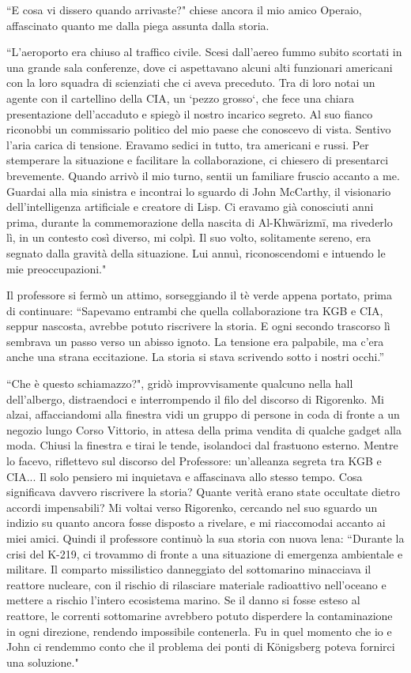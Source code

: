 \documentclass[12pt,b5paper]{article}
\begin{document}
``E cosa vi dissero quando arrivaste?" chiese ancora il mio amico Operaio,
affascinato quanto me dalla piega assunta dalla storia.

``L'aeroporto era chiuso al traffico civile. Scesi dall'aereo fummo subito scortati
in una grande sala conferenze, dove ci aspettavano alcuni alti funzionari americani
con la loro squadra di scienziati che ci aveva preceduto.
Tra di loro notai un agente con il cartellino della CIA, un `pezzo grosso`, che fece una
chiara presentazione dell'accaduto e spiegò il nostro incarico segreto. Al
suo fianco riconobbi un commissario politico del mio paese che conoscevo di vista.
Sentivo l'aria carica di tensione. Eravamo sedici in tutto, tra americani e
russi. Per stemperare la situazione e facilitare la collaborazione, ci chiesero
di presentarci brevemente. Quando arrivò il mio turno, sentii un familiare
fruscio accanto a me. Guardai alla mia sinistra e incontrai lo sguardo di
John McCarthy, il visionario dell'intelligenza artificiale e creatore di Lisp. Ci eravamo già conosciuti anni prima, durante la commemorazione
della nascita di Al-Khwārizmī, ma rivederlo lì, in un contesto così diverso,
mi colpì. Il suo volto, solitamente sereno, era segnato dalla gravità della
situazione. Lui annuì, riconoscendomi e intuendo le mie preoccupazioni."

Il professore si fermò un attimo, sorseggiando il tè verde appena portato, prima di
continuare: ``Sapevamo entrambi che quella collaborazione tra KGB e CIA, seppur nascosta,
avrebbe potuto riscrivere la storia. E ogni secondo trascorso lì sembrava un passo
verso un abisso ignoto. La tensione era palpabile, ma c’era anche una strana
eccitazione. La storia si stava scrivendo sotto i nostri occhi.”

``Che è questo schiamazzo?", gridò improvvisamente qualcuno nella hall
dell'albergo, distraendoci e interrompendo il filo del discorso di Rigorenko. Mi
alzai, affacciandomi alla finestra vidi un gruppo di persone in coda di fronte
a un negozio lungo Corso Vittorio, in attesa della prima vendita di qualche
gadget alla moda. Chiusi la finestra e tirai le tende, isolandoci dal frastuono
esterno. Mentre lo facevo, riflettevo sul discorso del Professore: un'alleanza
segreta tra KGB e CIA... Il solo pensiero mi inquietava e affascinava allo stesso
tempo. Cosa significava davvero riscrivere la storia? Quante verità erano state
occultate dietro accordi impensabili? Mi voltai verso Rigorenko, cercando nel
suo sguardo un indizio su quanto ancora fosse disposto a rivelare, e mi
riaccomodai accanto ai miei amici. Quindi il professore continuò la sua storia con nuova lena: ``Durante
la crisi del K-219, ci trovammo di fronte a una situazione di emergenza
ambientale e militare. Il comparto missilistico danneggiato del sottomarino
minacciava il reattore nucleare, con il rischio di rilasciare materiale
radioattivo nell'oceano e mettere a rischio l'intero ecosistema marino.
Se il danno si fosse esteso al reattore, le correnti sottomarine avrebbero potuto
disperdere la contaminazione in ogni direzione, rendendo impossibile contenerla.
Fu in quel momento che io e John ci rendemmo conto che il problema dei ponti di
Königsberg poteva fornirci una soluzione."
\end{document}
